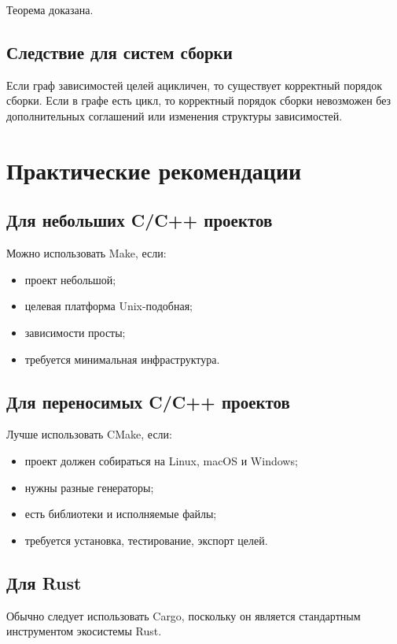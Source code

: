 \documentclass[12pt,a4paper]{article}
\begin{document}
Теорема доказана.

\subsection{Следствие для систем сборки}

Если граф зависимостей целей ацикличен, то существует корректный порядок сборки. Если в графе есть цикл, то корректный порядок сборки невозможен без дополнительных соглашений или изменения структуры зависимостей.

\section{Практические рекомендации}

\subsection{Для небольших C/C++ проектов}

Можно использовать Make, если:
\begin{itemize}
    \item проект небольшой;
    \item целевая платформа Unix-подобная;
    \item зависимости просты;
    \item требуется минимальная инфраструктура.
\end{itemize}

\subsection{Для переносимых C/C++ проектов}

Лучше использовать CMake, если:
\begin{itemize}
    \item проект должен собираться на Linux, macOS и Windows;
    \item нужны разные генераторы;
    \item есть библиотеки и исполняемые файлы;
    \item требуется установка, тестирование, экспорт целей.
\end{itemize}

\subsection{Для Rust}

Обычно следует использовать Cargo, поскольку он является стандартным инструментом экосистемы Rust.
\end{document}

